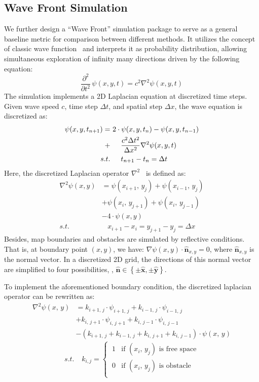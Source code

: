 \subsection{Wave Front Simulation}\label{sec:impl/wavefront}
We further design a ``Wave Front'' simulation package to serve as a general baseline metric for comparison between different methods. It utilizes the concept of classic wave function~\cite{Maxwell1865} and interprets it as probability distribution, allowing simultaneous exploration of infinity many directions driven by the following equation:
\begin{equation}
\frac{\partial^2}{\partial t^2}\,\psi(x, y, t) = c^2 \nabla^2\psi(x, y, t)
\end{equation}
The simulation implements a 2D Laplacian equation at discretized time steps. Given wave speed $c$, time step $\Delta t$, and spatial step $\Delta x$, the wave equation is discretized as:
\begin{align*}
\psi(x, y, t_{n+1})
=~& 2\cdot \psi(x, y, t_{n}) - \psi(x, y, t_{n-1}) \\
+~& \z~ ~ \frac{c^2 \Delta t^2}{\Delta x^2} \nabla^2\psi(x, y, t) \\
s.t.~& \z~ ~ t_{n+1} - t_{n} = \Delta t
\end{align*}
Here, the discretized Laplacian operator $\nabla^2$~\cite{FDTD2000Wave} is defined as:
\begin{align*}
\nabla^2\psi(x, y)
& = \psi(x_{i+1},\,y_j)
  + \psi(x_{i-1},\,y_j) \\
& + \psi(x_i,\,y_{j+1})
  + \psi(x_i,\,y_{j-1}) \\
& - 4\cdot\psi(x, y) \\
s.t.~& ~ ~ ~ \, x_{i+1} - x_i = y_{j+1} - y_j = \Delta x
\end{align*}
Besides, map boundaries and obstacles are simulated by reflective conditions. That is, at boundary point $(x, y)$, we have: $\nabla\psi(x, y) \cdot \mathbf{\hat{n}}_{x, y} = 0$, where $\mathbf{\hat{n}}_{x, y}$ is the normal vector.
In a discretized 2D grid, the directions of this normal vector are simplified to four possibilities, \ie, $\mathbf{\hat{n}} \in \left\{ \pm \mathbf{\hat{x}}, \pm \mathbf{\hat{y}} \right\}$.

To implement the aforementioned boundary condition, the discretized laplacian operator can be rewritten as:
\begin{align*}
    \nabla^2\psi(x,\,y)
    & = k_{i+1,\,j} \cdot \psi_{i+1,\,j}
      + k_{i-1,\,j} \cdot \psi_{i-1,\,j} \\
    & + k_{i,\,j+1} \cdot \psi_{i,\,j+1}
      + k_{i,\,j-1} \cdot \psi_{i,\,j-1} \\
    & - (k_{i+1,\,j} + k_{i-1,\,j} + k_{i,\,j+1} + k_{i,\,j-1})\cdot\psi(x,\,y)
\end{align*}
{\small\begin{equation*}
s.t.~ ~ ~ ~ \, k_{i,j} = \left\{~\begin{matrix}
        1 & \text{if } (x_i,\,y_j) \text{ is free space} \\[2mm]
        0 & \text{if } (x_i,\,y_j) \text{ is obstacle ~} \\
    \end{matrix}\right.
\end{equation*}}

